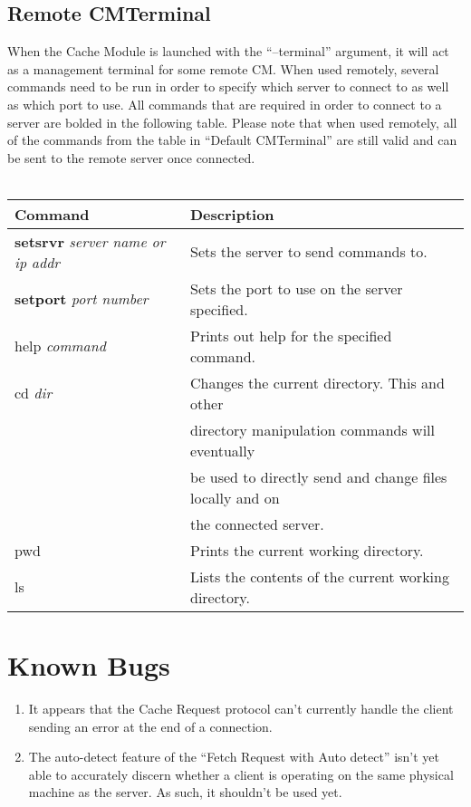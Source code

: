 \documentclass[letterpaper]{article}
\begin{document}
\subsection{Remote CMTerminal}
When the Cache Module is launched with the ``--terminal'' argument, it will act as a management terminal for some remote CM. When used remotely, several commands need to be run in order to specify which server to connect to as well as which port to use. All commands that are required in order to connect to a server are bolded in the following table. Please note that when used remotely, all of the commands from the table in ``Default CMTerminal'' are still valid and can be sent to the remote server once connected.
\\
\\
\begin{tabular}{|l|l|}
\hline
\textbf{Command} & \textbf{Description}\\
\hline
\hline
\textbf{setsrvr} \textit{server name or ip addr} & Sets the server to send commands to. \\
\hline
\textbf{setport} \textit{port number} & Sets the port to use on the server specified. \\
\hline
help \textit{command} & Prints out help for the specified command. \\
\hline
cd \textit{dir} & Changes the current directory. This and other\\
                & directory manipulation commands will eventually \\
                & be used to directly send and change files locally and on\\
                & the connected server.\\
\hline
pwd & Prints the current working directory. \\
\hline
ls & Lists the contents of the current working directory.\\
\hline
\end{tabular}

\section{Known Bugs}
\begin{enumerate}
   \item It appears that the Cache Request protocol can't currently handle the client sending an error at the end of a connection.
   \item The auto-detect feature of the ``Fetch Request with Auto detect'' isn't yet able to accurately discern whether a client is operating on the same physical machine as the server. As such, it shouldn't be used yet.
\end{enumerate}
\end{document}
